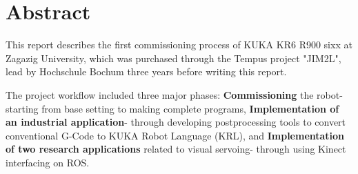 \chapter*{Abstract}\label{ch:abstract}
%
%


This report describes the first commissioning process of KUKA KR6 R900 sixx at Zagazig University, which was purchased through the Tempus project "JIM2L", lead by Hochschule Bochum three years before writing this report.

The project workflow included three major phases: \textbf{Commissioning} the robot- starting from base setting to making complete programs,  \textbf{Implementation of an industrial application}- through developing postprocessing tools to convert conventional G-Code to KUKA Robot Language (KRL), and \textbf{ Implementation of two research applications} related to visual servoing- through using Kinect interfacing on ROS.